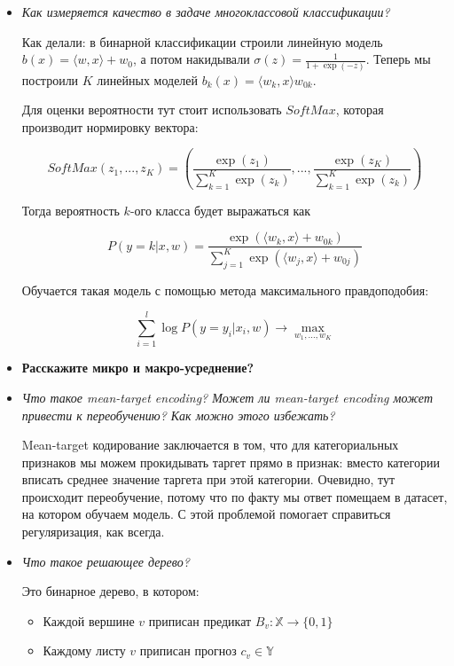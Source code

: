 \documentclass[12pt]{article}
\begin{document}
\begin{itemize}

\item \textit{Как измеряется качество в задаче многоклассовой классификации?}

Как делали: в бинарной классификации строили линейную модель $b(x) = \langle w, x \rangle + w_0$, а потом накидывали $\sigma(z) = \frac{1}{1+\exp(-z)}$. Теперь мы построили $K$ линейных моделей $b_k(x) = \langle w_k, x \rangle w_{0k}$.

Для оценки вероятности тут стоит использовать $SoftMax$, которая производит нормировку вектора:

\[ SoftMax(z_1, ..., z_K) = \left( \frac{\exp(z_1)}{\sum_{k=1}^K \exp(z_k)}, ...,  \frac{\exp(z_K)}{\sum_{k=1}^K \exp(z_k)} \right) \]

Тогда вероятность $k$-ого класса будет выражаться как 

\[ P(y=k|x, w) = \frac{\exp(\langle w_k, x \rangle + w_{0k})}{\sum_{j=1}^K \exp( \langle w_j, x \rangle + w_{0j} )} \]

Обучается такая модель с помощью метода максимального правдоподобия:

\[  \sum_{i=1}^l \log P(y=y_i | x_i, w) \rightarrow \max_{w_1, ..., w_K} \]

\item \textbf{Расскажите микро и макро-усреднение?}

\item \textit{Что такое mean-target encoding?  Может ли mean-target encoding может привести к переобучению? Как можно этого
избежать?}

Mean-target кодирование заключается в том, что для категориальных признаков мы можем прокидывать таргет прямо в признак: вместо категории вписать среднее значение таргета при этой категории. Очевидно, тут происходит переобучение, потому что по факту мы ответ помещаем в датасет, на котором обучаем модель. С этой проблемой помогает справиться регуляризация, как всегда.

\item \textit{Что такое решающее дерево?}

Это бинарное дерево, в котором:

\begin{itemize}
\item Каждой вершине $v$ приписан предикат $B_v: \mathbb{X} \rightarrow \{ 0, 1 \}$
\item Каждому листу $v$ приписан прогноз $c_v \in \mathbb{Y}$
\end{itemize}


\end{itemize}
\end{document}
